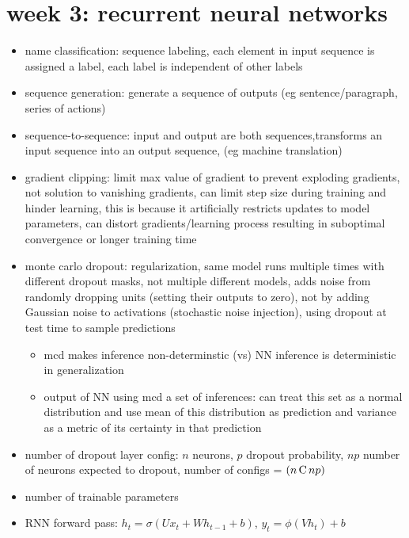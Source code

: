 \documentclass[10pt]{article}
\begin{document}
\section*{week 3: recurrent neural networks}

\begin{itemize}[label=\(\star\), leftmargin=1em, itemsep=-0.3em]
    \item name classification: sequence labeling, each element in input sequence is assigned a label, each label is independent of other labels
    \item sequence generation: generate a sequence of outputs (eg sentence/paragraph, series of actions)
    \item sequence-to-sequence: input and output are both sequences,transforms an input sequence into an output sequence, (eg machine translation)
    \item gradient clipping: limit max value of gradient to prevent exploding gradients, not solution to vanishing gradients, can limit step size during training and hinder learning, this is because it artificially restricts updates to model parameters, can distort gradients/learning process resulting in suboptimal convergence or longer training time
    \item monte carlo dropout: regularization, same model runs multiple times with different dropout masks, not multiple different models, adds noise from randomly dropping units (setting their outputs to zero), not by adding Gaussian noise to activations (stochastic noise injection), using dropout at test time to sample predictions
          \begin{itemize}[label=\(\star\),leftmargin=1em, itemsep=-0.3em]
              \item mcd makes inference non-determinstic (vs) NN inference is deterministic in generalization
              \item output of NN using mcd a set of inferences: can treat this set as a normal distribution and use mean of this distribution as prediction and variance as a metric of its certainty in that prediction
          \end{itemize}
    \item number of dropout layer config: $n$ neurons, $p$ dropout probability, $np$ number of neurons expected to dropout, number of configs = $(n\,{\operatorfont{C}}\,np)$
    \item number of trainable parameters
    \item RNN forward pass: $h_t = \sigma(Ux_t + Wh_{t-1} + b)$, $y_t = \phi(Vh_t) + b$

\end{itemize}
\end{document}
